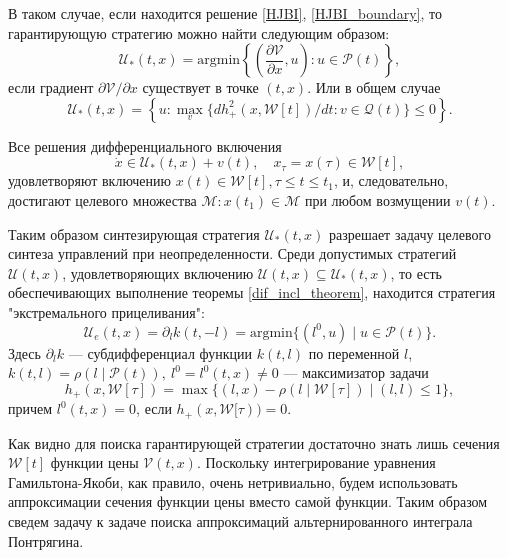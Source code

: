 В таком случае, если находится решение \eqref{HJBI}, \eqref{HJBI_boundary}, то гарантирующую стратегию можно
 найти следующим образом:
\begin{equation}
    \mathcal{U}_*(t,x) = \mathrm{argmin} \left\{ \left( \frac{\partial \mathcal{V}}{\partial x},
     u \right) : u \in \mathcal{P}(t) \right\},
\end{equation}
если градиент \( \partial \mathcal{V} / \partial x \) существует в точке \( (t, x) \). Или в общем
 случае
\begin{equation}
    \mathcal{U}_*(t,x) = \left\{ u: \max_v \{ dh_+^2(x, \mathcal{W}[t]) / dt : v \in \mathcal{Q}(t) \} 
     \le 0 \right\}.
\end{equation}

\begin{theorem}\label{dif_incl_theorem}
    Все решения дифференциального включения
    \begin{equation*}
        \dot{x} \in \mathcal{U}_*(t,x) + v(t), \quad x_{\tau} = x(\tau) \in \mathcal{W}[t],
    \end{equation*}
    удовлетворяют включению \( x(t) \in \mathcal{W}[t] , \tau \le t \le t_1 \), и, следовательно,
     достигают целевого множества \( \mathcal{M} : x(t_1) \in \mathcal{M} \) при любом возмущении
     \( v(t) \). 
\end{theorem}

Таким образом синтезирующая стратегия \( \mathcal{U}_*(t,x) \) разрешает задачу целевого синтеза 
 управлений при неопределенности. Среди допустимых стратегий \( \mathcal{U}(t,x) \), удовлетворяющих
 включению \( \mathcal{U}(t,x) \subseteq \mathcal{U}_*(t,x) \), то есть обеспечивающих выполнение
 теоремы \eqref{dif_incl_theorem}, находится стратегия "экстремального прицеливания":
\begin{equation}
    \mathcal{U}_e(t,x) = \partial_l k(t, -l) = \mathrm{arg min} \{(l^0, u) \mid u \in \mathcal{P}(t) \}.
\end{equation}
Здесь \( \partial_l k \) --- субдифференциал функции \( k(t, l) \) по переменной \( l \), \( k(t,l)
 = \rho(l \mid \mathcal{P}(t)), \ l^0 = l^0(t, x) \ne 0 \) --- максимизатор задачи 
\begin{equation}\label{extr_problem}
    h_+(x, \mathcal{W}[\tau]) = \max \{(l,x) - \rho(l \mid \mathcal{W}[\tau]) \mid (l,l) \le 1 \},
\end{equation}
причем \( l^0(t,x) = 0 \), если \( h_+(x, \mathcal{W}[\tau)) = 0 \).

Как видно для поиска гарантирующей стратегии достаточно знать лишь сечения \( \mathcal{W}[t] \) функции
 цены \( \mathcal{V}(t,x) \). Поскольку интегрирование уравнения Гамильтона-Якоби, как правило, очень 
 нетривиально, будем использовать аппроксимации сечения функции цены вместо самой функции. Таким 
 образом сведем задачу к задаче поиска аппроксимаций альтернированного интеграла Понтрягина.

